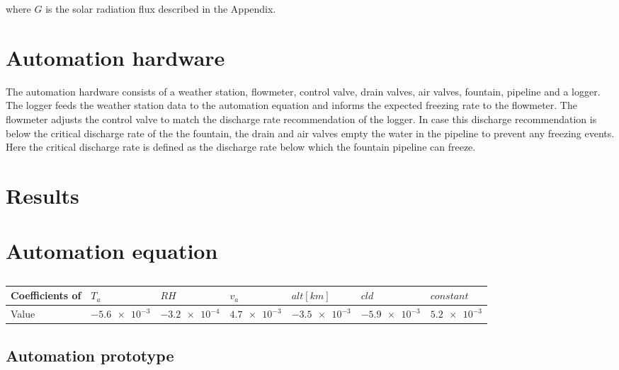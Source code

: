 \documentclass[utf8]{frontiersSCNS}
\begin{document}
where $G$ is the solar radiation flux described in the Appendix.

\section{Automation hardware}

The automation hardware consists of a weather station, flowmeter, control valve, drain valves, air valves,
fountain, pipeline and a logger. The logger feeds the weather station data to the automation equation and
informs the expected freezing rate to the flowmeter. The flowmeter adjusts the control valve to match the
discharge rate recommendation of the logger. In case this discharge recommendation is below the critical
discharge rate of the the fountain, the drain and air valves empty the water in the pipeline to prevent any
freezing events. Here the critical discharge rate is defined as the discharge rate below which the fountain
pipeline can freeze.


\section{Results}


\section{Automation equation}

\begin{table}[ht]
\centering
\caption{}
\label{tab:my-table}
\begin{tabular}{@{}lllllll@{}}
\toprule
Coefficients of & $T_a$ & $RH$ & $v_a$ & $alt [km]$ & $cld$ & $constant$ \\ \midrule
Value           & $\num{-5.6 e-3}$     & $\num{-3.2 e-4}$ & $\num{4.7 e-3}$ & $\num{-3.5 e-3}$ & $\num{-5.9 e-3}$ & $\num{5.2 e-3}$
                \\ \bottomrule
\end{tabular}
\end{table}

\subsection{Automation prototype}
\end{document}
